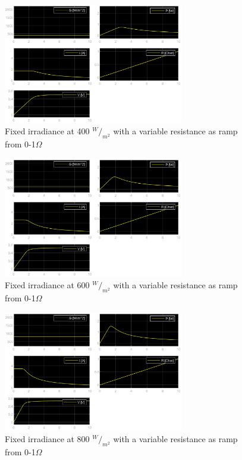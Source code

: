 		\begin{figure}[H]
			\centering
			\includegraphics[width=0.7\textwidth]{figures/g400.eps}
			\caption{Fixed irradiance at 400 $^W/_{m^2}$ with a variable resistance as ramp from 0-1$\Omega$}
			\label{fig:g400}
		\end{figure}
		\begin{figure}[H]
			\centering
			\includegraphics[width=0.7\textwidth]{figures/g600.eps}
			\caption{Fixed irradiance at 600 $^W/_{m^2}$ with a variable resistance as ramp from 0-1$\Omega$}
			\label{fig:g600}
		\end{figure}	
		\begin{figure}[H]
			\centering
			\includegraphics[width=0.7\textwidth]{figures/g800.eps}
			\caption{Fixed irradiance at 800 $^W/_{m^2}$ with a variable resistance as ramp from 0-1$\Omega$}
			\label{fig:g800}
		\end{figure}	
